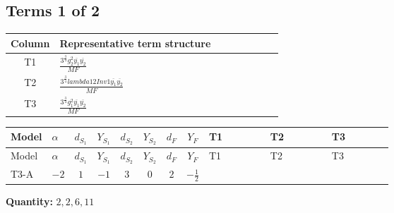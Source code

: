 \documentclass[8pt]{article}
\begin{document}
\begin{landscape}
\subsection*{Terms 1 of 2}
\begin{center}
\begin{tabular}{@{}c >{\raggedright\arraybackslash}p{0.82\linewidth}@{}}
\toprule
Column & Representative term structure \\
\midrule
T1 & \(\displaystyle \frac{3^{\frac{3}{4}} g_{2}^{2} \overline{y_{1}} \overline{y_{2}}}{MF}\) \\
\midrule
T2 & \(\displaystyle \frac{3^{\frac{3}{4}} lambda12Inv1 \overline{y_{1}} \overline{y_{2}}}{MF}\) \\
\midrule
T3 & \(\displaystyle \frac{3^{\frac{3}{4}} g_{1}^{2} \overline{y_{1}} \overline{y_{2}}}{MF}\) \\
\midrule
\bottomrule
\end{tabular}
\end{center}
\smallskip
\tiny
\begin{longtable}{@{}llcccccc >{\raggedright\arraybackslash}p{0.21\linewidth} >{\raggedright\arraybackslash}p{0.21\linewidth} >{\raggedright\arraybackslash}p{0.21\linewidth}@{}}
\toprule
Model & $\alpha$ & $d_{S_1}$ & $Y_{S_1}$ & $d_{S_2}$ & $Y_{S_2}$ & $d_F$ & $Y_F$ & T1 & T2 & T3 \\
\midrule
\endfirsthead
\toprule
Model & $\alpha$ & $d_{S_1}$ & $Y_{S_1}$ & $d_{S_2}$ & $Y_{S_2}$ & $d_F$ & $Y_F$ & T1 & T2 & T3 \\
\midrule
\endhead
T3-A & $-2$ & $1$ & $-1$ & $3$ & $0$ & $2$ & $-\frac{1}{2}$ & \scriptsize\adjustbox{max width=\linewidth}{$\begin{gathered} - \frac{11 \cdot 3^{\frac{3}{4}} g_{2}^{2} \overline{y_{1}} \overline{y_{2}}}{8 MF}\end{gathered}$} & \scriptsize\adjustbox{max width=\linewidth}{$\begin{gathered} - \frac{3^{\frac{3}{4}} lambda12Inv1 \overline{y_{1}} \overline{y_{2}}}{6 MF}\end{gathered}$} & \scriptsize\adjustbox{max width=\linewidth}{$\begin{gathered} - \frac{3^{\frac{3}{4}} g_{1}^{2} \overline{y_{1}} \overline{y_{2}}}{8 MF}\end{gathered}$} \\
\midrule
\bottomrule
\end{longtable}
\clearpage
\noindent\textbf{Quantity: }$\mathrm{2,2,6,11}$\par\smallskip

\end{landscape}
\end{document}
